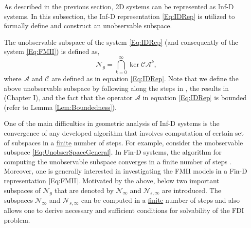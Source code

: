 \documentclass[journal,12pt,draftcls,onecolumn]{IEEEtran}
\newcommand{\ssp}[1]{\mathscr{#1}}      \newcommand{\setssp}[1]{\mathfrak{#1}}   \newcommand{\fld}[1]{\mathbb{#1}}       \newcommand{\op}[1]{\mathcal{#1}}       \newcommand{\sumbanach}[1]{\sum{#1}}
\begin{document}
As described in the previous section, 2D systems can be represented as Inf-D systems. In this subsection, the Inf-D representation \eqref{Eq:IDRep} is utilized to formally define and construct an unobservable subspace.




The unobservable subspace of the system \eqref{Eq:IDRep} (and consequently of the system \eqref{Eq:FMII}) is defined as,
\begin{equation}\label{Eq:UnobserSpaceGeneral}
	\ssp{N}_g =\bigcap_{k=0}^\infty\ker\op{C}\op{A}^k,
\end{equation}
where $\op{A}$ and $\op{C}$ are defined as in equation \eqref{Eq:IDRep}. Note that we define the above unobservable subspace by following along the steps in \cite{Curtain_1986}, the results in \cite{Zwart_Book} (Chapter I), and the fact that the operator $\op{A}$ in equation \eqref{Eq:IDRep} is bounded (refer to Lemma \ref{Lem:Boundedness}).

One of the main difficulties in geometric analysis of Inf-D systems is the convergence of any developed algorithm that involves computation of certain set of subspaces in a \underline{finite} number of steps. For example, consider the unobservable subspace \eqref{Eq:UnobserSpaceGeneral}. In Fin-D systems, the algorithm for computing the unobservable subspace converges in a finite number of steps \cite{Wonham_Book}. Moreover, one is generally interested in investigating the FMII models in a Fin-D representation \eqref{Eq:FMII}.  Motivated by the above, below two important subspaces of $\ssp{N}_g$ that are denoted by $\ssp{N}_\infty$ and $\ssp{N}_{s,\infty}$ are introduced. The subspaces $\ssp{N}_\infty$ and $\ssp{N}_{s,\infty}$  can be computed in a \underline{finite} number of steps and also allows one to derive necessary and sufficient conditions for solvability of the FDI problem.
\end{document}
